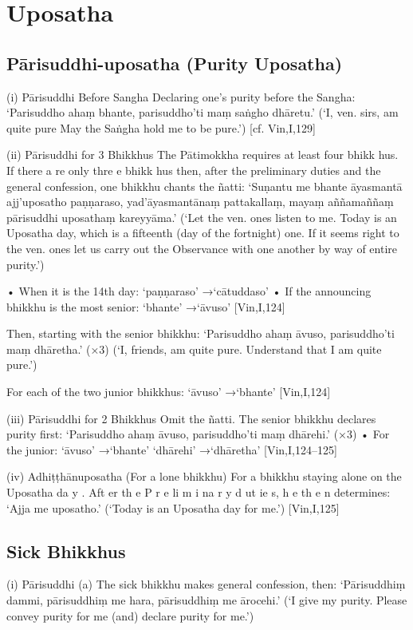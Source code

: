 \chapter{Uposatha}

\section{Pārisuddhi-uposatha (Purity Uposatha)}

(i) Pārisuddhi Before Sangha
Declaring one’s purity before the Sangha:
‘Parisuddho ahaṃ bhante,
parisuddho’ti maṃ saṅgho dhāretu.’
(‘I, ven. sirs, am quite pure
May the Saṅgha hold me to be pure.’)
[cf. Vin,I,129]

(ii) Pārisuddhi for 3 Bhikkhus
The Pātimokkha requires at least four
bhikk hus. If there a re only thre e bhikk hus
then, after the preliminary duties and the general confession, one bhikkhu chants the ñatti:
‘Suṇantu me bhante āyasmantā ajj’uposatho
paṇṇaraso, yad’āyasmantānaṃ pattakallaṃ,
mayaṃ aññamaññaṃ pārisuddhi uposathaṃ
kareyyāma.’
(‘Let the ven. ones listen to me. Today is an Uposatha
day, which is a fifteenth (day of the fortnight) one. If
it seems right to the ven. ones let us carry out the
Observance with one another by way of entire purity.’)

• When it is the 14th day:
‘paṇṇaraso’ →‘cātuddaso’
• If the announcing bhikkhu is the most senior:
‘bhante’ →‘āvuso’
[Vin,I,124]

Then, starting with the senior bhikkhu:
‘Parisuddho ahaṃ āvuso,
parisuddho’ti maṃ dhāretha.’ (×3)
(‘I, friends, am quite pure.
Understand that I am quite pure.’)

For each of the two junior bhikkhus:
‘āvuso’ →‘bhante’
[Vin,I,124]

(iii) Pārisuddhi for 2 Bhikkhus
Omit the ñatti. The senior bhikkhu declares
purity first:
‘Parisuddho ahaṃ āvuso,
parisuddho’ti maṃ dhārehi.’ (×3)
• For the junior:
‘āvuso’ →‘bhante’
‘dhārehi’ →‘dhāretha’
[Vin,I,124–125]

(iv) Adhiṭṭhānuposatha (For a lone bhikkhu)
For a bhikkhu staying alone on the Uposatha
da y . Aft er th e P r e li m i na r y d ut ie s, h e th e n
determines:
‘Ajja me uposatho.’
(‘Today is an Uposatha day for me.’)
[Vin,I,125]

\section{Sick Bhikkhus}

(i) Pārisuddhi
(a) The sick bhikkhu makes general
confession, then:
‘Pārisuddhiṃ dammi,
pārisuddhiṃ me hara,
pārisuddhiṃ me ārocehi.’
(‘I give my purity. Please convey purity for me
(and) declare purity for me.’)

